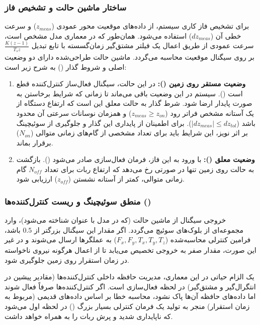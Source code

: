 	\subsubsection{ساختار ماشین حالت و تشخیص فاز}
	\label{subsubsec:method-state-machine-structure}
	برای تشخیص فاز کاری سیستم، از داده‌های موقعیت محور عمودی ($z_{meas}$) و سرعت خطی آن ($dz_{meas}$) استفاده می‌شود. همان‌طور که در معماری مدل مشخص است، سرعت عمودی از طریق اعمال یک فیلتر مشتق‌گیر زمان‌گسسته با تابع تبدیل $\frac{K(z-1)}{T_s z}$ بر روی سیگنال موقعیت محاسبه می‌گردد. ماشین حالت طراحی‌شده دارای دو وضعیت اصلی و شروط گذار () به شرح زیر است:
	
	\begin{enumerate}
		\item \textbf{وضعیت مستقر روی زمین ():} 
		در این حالت، سیگنال فعال‌ساز کنترل‌کننده قطع است (). سیستم در این وضعیت باقی می‌ماند تا زمانی که شرایط برخاستن به صورت پایدار ارضا شود. شرط گذار به حالت معلق این است که ارتفاع دستگاه از یک آستانه مشخص فراتر رود ($z_{meas} \geq z_{on}$) و همزمان نوسانات سرعتی آن محدود باشد ($|dz_{meas}| \leq dz_{tol}$). برای اطمینان از پایداری این گذار و جلوگیری از سوئیچینگ بر اثر نویز، این شرایط باید برای تعداد مشخصی از گام‌های زمانی متوالی ($N_{on}$) برقرار بماند.
		
		\item \textbf{وضعیت معلق ():}
		با ورود به این فاز، فرمان فعال‌سازی صادر می‌شود (). بازگشت به حالت روی زمین تنها در صورتی رخ می‌دهد که ارتفاع ربات برای تعداد $N_{off}$ گام زمانی متوالی، کمتر از آستانه نشستن ($z_{off}$) ارزیابی شود.
	\end{enumerate}
	
	\subsubsection{منطق سوئیچینگ و ریست کنترل‌کننده‌ها ()}
	\label{subsubsec:method-reset-logic}
	خروجی سیگنال  از ماشین حالت (که در مدل با عنوان  شناخته می‌شود)، وارد مجموعه‌ای از بلوک‌های سوئیچ می‌گردد. اگر مقدار این سیگنال بزرگتر از $0.5$ باشد، فرامین کنترلی محاسبه‌شده ($F_x, F_y, T_x, T_y, T_z$) به عملگرها ارسال می‌شوند و در غیر این صورت، مقدار صفر به خروجی تخصیص می‌یابد تا از اعمال هرگونه نیروی ناخواسته در زمان استقرار روی زمین جلوگیری شود.
	
	یک الزام حیاتی در این معماری، مدیریت حافظه داخلی کنترل‌کننده‌ها (مقادیر پیشین در انتگرال‌گیر و مشتق‌گیر) در لحظه فعال‌سازی است. اگر کنترل‌کننده‌ها صرفاً فعال شوند اما داده‌های حافظه آن‌ها پاک نشود، محاسبه خطا بر اساس داده‌های قدیمی (مربوط به زمان استقرار) منجر به تولید یک فرمان کنترلی بسیار بزرگ () در لحظه اول می‌شود که ناپایداری شدید و پرش ربات را به همراه خواهد داشت. 
	
